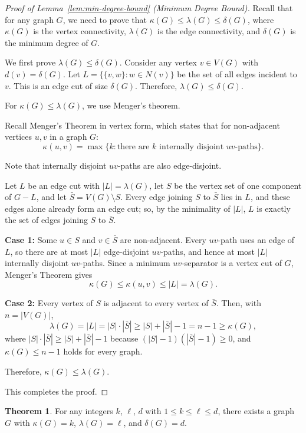 \documentclass{article}
\theoremstyle{definition}
\newtheorem{theorem}{Theorem}
\begin{document}
\begin{proof}[Proof of Lemma~\ref{lem:min-degree-bound} (Minimum Degree Bound)]
Recall that for any graph $G$, we need to prove that $\kappa(G) \leq \lambda(G) \leq \delta(G)$, where $\kappa(G)$ is the vertex connectivity, $\lambda(G)$ is the edge connectivity, and $\delta(G)$ is the minimum degree of $G$.

We first prove $\lambda(G) \leq \delta(G)$. Consider any vertex $v \in V(G)$ with $d(v) = \delta(G)$. 
Let $L = \{\{v,w\} : w \in N(v)\}$ be the set of all edges incident to $v$.
This is an edge cut of size $\delta(G)$.
Therefore, $\lambda(G) \leq \delta(G)$.

For $\kappa(G) \leq \lambda(G)$, we use Menger's theorem.

Recall Menger's Theorem in vertex form, which states that for non-adjacent vertices $u,v$ in a graph $G$:
$$\kappa(u,v) = \max\{ k : \text{there are $k$ internally disjoint $uv$-paths}\}.$$

Note that internally disjoint $uv$-paths are also edge-disjoint.

Let $L$ be an edge cut with $|L| = \lambda(G)$, let $S$ be the vertex set of one component of $G - L$, and let $\bar{S} = V(G) \setminus S$. Every edge joining $S$ to $\bar{S}$ lies in $L$, and these edges alone already form an edge cut; so, by the minimality of $|L|$, $L$ is exactly the set of edges joining $S$ to $\bar{S}$.

\textbf{Case 1:} Some $u \in S$ and $v \in \bar{S}$ are non-adjacent. Every $uv$-path uses an edge of $L$, so there are at most $|L|$ edge-disjoint $uv$-paths, and hence at most $|L|$ internally disjoint $uv$-paths. Since a minimum $uv$-separator is a vertex cut of $G$, Menger's Theorem gives
$$\kappa(G) \leq \kappa(u,v) \leq |L| = \lambda(G).$$

\textbf{Case 2:} Every vertex of $S$ is adjacent to every vertex of $\bar{S}$. Then, with $n = |V(G)|$,
$$\lambda(G) = |L| = |S| \cdot |\bar{S}| \geq |S| + |\bar{S}| - 1 = n - 1 \geq \kappa(G),$$
where $|S| \cdot |\bar{S}| \geq |S| + |\bar{S}| - 1$ because $(|S| - 1)(|\bar{S}| - 1) \geq 0$, and $\kappa(G) \leq n - 1$ holds for every graph.

Therefore, $\kappa(G) \leq \lambda(G)$.

This completes the proof.
\end{proof}

\begin{theorem}
For any integers $k$, $\ell$, $d$ with $1 \leq k \leq \ell \leq d$, there exists a graph $G$ with
$\kappa(G) = k$, $\lambda(G) = \ell$, and $\delta(G) = d$.
\end{theorem}
\end{document}
